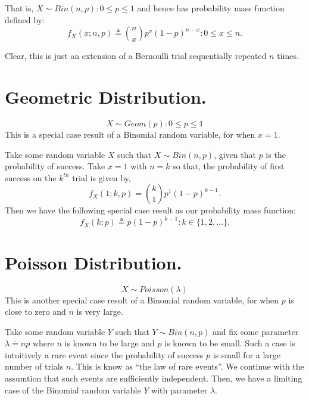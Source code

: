 That is, $X \sim Bin(n, p) : 0 \leq p \leq 1$ and hence has probability mass function defined by:
\begin{equation}\label{eqn:binomial}
 \boxed{f_{X}(x; n, p) \triangleq {n \choose x} p^{x} (1 - p)^{n - x} : 0 \leq x \leq n.}
\end{equation}

Clear, this is just an extension of a Bernoulli trial sequentially repeated $n$ times.

\section{Geometric Distribution.}
\begin{equation}\label{eqn:geometricdist}
 \boxed{X \sim Geom(p) : 0 \leq p \leq 1}
\end{equation}
This is a special case result of a Binomial random variable, for when $x=1$.

Take some random variable $X$ such that $X \sim Bin(n, p)$, given that $p$ is the probability of success.
Take $x=1$ with $n=k$ so that, the probability of first success on the $k^{th}$ trial is given by,
\[
 f_{X}(1; k, p) = {k \choose 1} p^{1} (1 - p)^{k - 1}.
\]
Then we have the following special case result as our probability mass function:
\begin{equation}\label{eqn:geometric}
 \boxed{f_{X}(k; p) \triangleq p (1 - p)^{k - 1} : k \in \{1, 2, \dots\} .}
\end{equation}

\section{Poisson Distribution.}
\begin{equation}\label{eqn:poissondist}
 \boxed{X \sim Poisson(\lambda)}
\end{equation}
This is another special case result of a Binomial random variable, for when $p$ is close to zero and $n$ is very large\cite{Papoulis-1991}.

Take some random variable $Y$ such that $Y \sim Bin(n, p)$ and fix some parameter $\lambda \doteq n p$ where $n$ is known to be large and $p$ is known to be small.
Such a case is intuitively a rare event since the probability of success $p$ is small for a large number of trials $n$. This is know as ``the law of rare events''\cite{homepages/93/8114}.
We continue with the assumtion that such events are sufficiently independent. Then, we have a limiting case of the Binomial random variable $Y$ with parameter $\lambda$.

